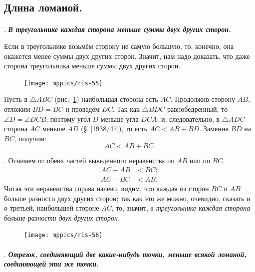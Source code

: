 \documentclass[twoside]{book}
\begin{document}
\subsection*{Длина ломаной.}

\paragraph{}\label{1938/50}
.
\textbf{\emph{В треугольнике каждая сторона меньше суммы двух других сторон.}}

Если в треугольнике возьмём сторону не самую большую, то, конечно, она окажется менее суммы двух других сторон.
Значит, нам надо доказать, что даже  сторона треугольника меньше суммы двух других сторон.

\begin{figure}
\centering
\texttt{[image: mppics/ris-55]}
\caption{}\label{1938/ris-55}
\end{figure}

Пусть в $\triangle ABC$ (рис.~\ref{1938/ris-55}) наибольшая сторона есть $AC$.
Продолжив сторону $AB$, отложим $BD=BC$ и проведём $DC$.
Так как $\triangle BDC$ равнобедренный, то $\angle D = \angle DCB$;
поэтому угол $D$ меньше угла $DCA$, и, следовательно, в $\triangle ADC$ сторона $AC$ меньше $AD$ (§~\ref{1938/47}), то есть
$AC < AB + BD$.
Заменив $BD$ на $BC$, получим:
\[AC < AB + BC.\]

\smallskip
\mbox{.}
Отнимем от обеих частей выведенного неравенства по $AB$ или по $BC$.
\begin{align*}
AC-AB&<BC;
\\
AC-BC&<AB.
\end{align*}
Читая эти неравенства справа налево, видим, что каждая из сторон $BC$ и $AB$ больше разности двух других сторон;
так как это же можно, очевидно, сказать и о третьей, наибольшей стороне $AC$, то, значит, \emph{в треугольнике каждая сторона больше разности двух других сторон.}

\begin{figure}
\centering
\texttt{[image: mppics/ris-56]}
\caption{}\label{1938/ris-56}
\end{figure}

\paragraph{}\label{1938/51}
\mbox{.}
\textbf{\emph{Отрезок, соединяющий две какие-нибудь точки, меньше всякой ломаной, соединяющей эти же точки.}}
\end{document}

